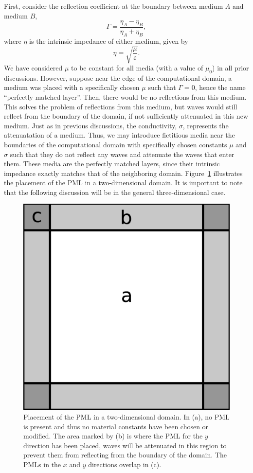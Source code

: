 \documentclass[12pt]{article}
\begin{document}
\begin{multicols}{2}
First, consider the reflection coefficient at the boundary between medium $A$ and medium $B$,
\begin{equation}
\Gamma = \frac{\eta_A-\eta_B}{\eta_A+\eta_B},
\end{equation}
where $\eta$ is the intrinsic impedance of either medium, given by
\begin{equation}
\eta=\sqrt{\frac{\mu}{\varepsilon}}.
\end{equation}
We have considered $\mu$ to be constant for all media (with a value of $\mu_0$) in all prior discussions. However, suppose near the edge of the computational domain, a medium was placed with a specifically chosen $\mu$ such that $\Gamma=0$, hence the name ``perfectly matched layer''. Then, there would be no reflections from this medium. This solves the problem of reflections from this medium, but waves would still reflect from the boundary of the domain, if not sufficiently attenuated in this new medium. Just as in previous discussions, the conductivity, $\sigma$, represents the attenuatation of a medium. Thus, we may introduce fictitious media near the boundaries of the computational domain with specifically chosen constants $\mu$ and $\sigma$ such that they do not reflect any waves and attenuate the waves that enter them. These media are the perfectly matched layers, since their intrinsic impedance exactly matches that of the neighboring domain. Figure~\ref{fig:PML} illustrates the placement of the PML in a two-dimensional domain. It is important to note that the following discussion will be in the general three-dimensional case.
\begin{figure}[H]
\centering
\includegraphics[width=0.8\linewidth]{PML.eps}
\caption{Placement of the PML in a two-dimensional domain. In (a), no PML is present and thus no material constants have been chosen or modified. The area marked by (b) is where the PML for the $y$ direction has been placed, waves will be attenuated in this region to prevent them from reflecting from the boundary of the domain. The PMLs in the $x$ and $y$ directions overlap in (c).}
\label{fig:PML}
\end{figure}


\end{multicols}
\end{document}
